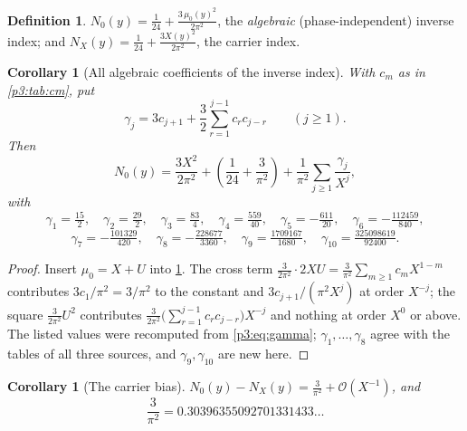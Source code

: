 \documentclass[11pt,a4paper,oneside]{book}
\theoremstyle{plain}
\newtheorem{corollary}[theorem]{Corollary}
\theoremstyle{definition}
\newtheorem{definition}[theorem]{Definition}
\theoremstyle{remark}
\newcommand{\bigO}{\mathcal{O}}
\begin{document}
\begin{definition}\label{p3:def:N0}
$\displaystyle N_{0}(y)=\frac1{24}+\frac{3\,\mu_{0}(y)^{2}}{2\pi^{2}}$, the \emph{algebraic}
(phase-independent) inverse index; and $\displaystyle
N_{X}(y)=\frac1{24}+\frac{3X(y)^{2}}{2\pi^{2}}$, the carrier index.
\end{definition}

\begin{corollary}[All algebraic coefficients of the inverse index]
\label{p3:cor:N0-expansion}
With $c_{m}$ as in \cref{p3:tab:cm}, put
\begin{equation}\label{p3:eq:gamma}
 \gamma_{j}=3c_{j+1}+\frac32\sum_{r=1}^{j-1}c_{r}c_{j-r}\qquad(j\ge1).
\end{equation}
Then
\begin{equation}\label{p3:eq:N0-expansion}
 N_{0}(y)=\frac{3X^{2}}{2\pi^{2}}
 +\left(\frac1{24}+\frac3{\pi^{2}}\right)
 +\frac1{\pi^{2}}\sum_{j\ge1}\frac{\gamma_{j}}{X^{j}},
\end{equation}
with
\begin{equation}\label{p3:eq:gamma-first}
 \gamma_{1}=\tfrac{15}2,\quad \gamma_{2}=\tfrac{29}2,\quad
 \gamma_{3}=\tfrac{83}4,\quad \gamma_{4}=\tfrac{559}{40},\quad
 \gamma_{5}=-\tfrac{611}{20},\quad \gamma_{6}=-\tfrac{112459}{840},
\end{equation}
\begin{equation}\label{p3:eq:gamma-more}
 \gamma_{7}=-\tfrac{101329}{420},\quad
 \gamma_{8}=-\tfrac{228677}{3360},\quad
 \gamma_{9}=\tfrac{1709167}{1680},\quad
 \gamma_{10}=\tfrac{325098619}{92400}.
\end{equation}
\end{corollary}

\begin{proof}
Insert $\mu_{0}=X+U$ into \cref{p3:def:N0}. The cross term $\frac{3}{2\pi^{2}}\cdot
2XU=\frac{3}{\pi^{2}}\sum_{m\ge1}c_{m}X^{1-m}$ contributes $3c_{1}/\pi^{2}=3/\pi^{2}$ to the
constant and $3c_{j+1}/(\pi^{2}X^{j})$ at order $X^{-j}$; the square $\frac{3}{2\pi^{2}}U^{2}$
contributes $\frac{3}{2\pi^{2}}\bigl(\sum_{r=1}^{j-1}c_{r}c_{j-r}\bigr)X^{-j}$ and nothing at
order $X^{0}$ or above. The listed values were recomputed from \cref{p3:eq:gamma};
$\gamma_{1},\dots,\gamma_{8}$ agree with the tables of all three sources, and
$\gamma_{9},\gamma_{10}$ are new here.
\end{proof}

\begin{corollary}[The carrier bias]\label{p3:cor:carrier-bias}
$\displaystyle N_{0}(y)-N_{X}(y)=\frac3{\pi^{2}}+\bigO(X^{-1})$, and
\begin{equation}\label{p3:eq:carrier-bias}
 \frac3{\pi^{2}}=0.30396355092701331433\ldots
\end{equation}
\end{corollary}
\end{document}
